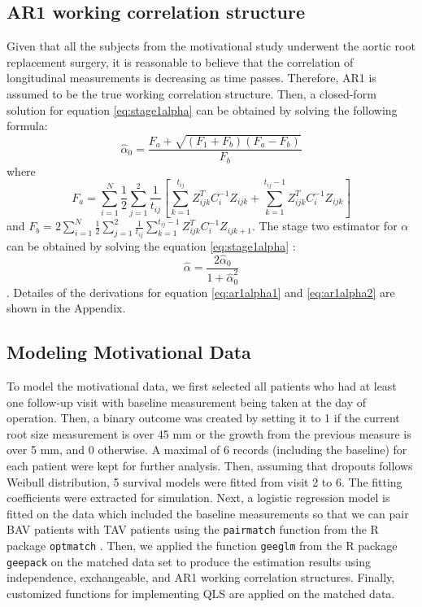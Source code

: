 \documentclass[
]{aft}
\begin{document}
\subsection{AR1 working correlation
structure}\label{ar1-working-correlation-structure}

Given that all the subjects from the motivational study underwent the
aortic root replacement surgery, it is reasonable to believe that the
correlation of longitudinal measurements is decreasing as time passes.
Therefore, AR1 is assumed to be the true working correlation structure.
Then, a closed-form solution for equation \eqref{eq:stage1alpha} can be
obtained by solving the following formula: \begin{equation}
\hat{\alpha}_0 = \frac{F_a + \sqrt{(F_1+F_b)(F_a-F_b)}}{F_b} \label{eq:ar1alpha1}
\end{equation} where \[
F_a = \sum_{i=1}^N \frac{1}{2} \sum_{j=1}^2 \frac{1}{t_{ij}}\left[\sum_{k=1}^{t_{ij}} Z_{ijk}^T C_i^{-1} Z_{ijk} + \sum_{k=1}^{t_{ij}-1}Z_{ijk}^T C_i^{-1} Z_{ijk}\right]
\] and
\(F_b = 2\sum_{i=1}^N \frac{1}{2}\sum_{j=1}^2\frac{1}{t_{ij}}\sum_{k=1}^{t_{ij}-1} Z_{ijk}^T C_i^{-1} Z_{ijk+1}\).
The stage two estimator for \(\alpha\) can be obtained by solving the
equation \eqref{eq:stage1alpha} \citep{Mitani2019}: \begin{equation}
\hat{\alpha} = \frac{2\hat{\alpha}_0}{1+\hat{\alpha}_0^2} \label{eq:ar1alpha2}
\end{equation}. Detailes of the derivations for equation
\eqref{eq:ar1alpha1} and \eqref{eq:ar1alpha2} are shown in the Appendix.

\subsection{Modeling Motivational
Data}\label{modeling-motivational-data}

To model the motivational data, we first selected all patients who had
at least one follow-up visit with baseline measurement being taken at
the day of operation. Then, a binary outcome was created by setting it
to 1 if the current root size measurement is over 45 mm or the growth
from the previous measure is over 5 mm, and 0 otherwise. A maximal of 6
records (including the baseline) for each patient were kept for further
analysis. Then, assuming that dropouts follows Weibull distribution, 5
survival models were fitted from visit 2 to 6. The fitting coefficients
were extracted for simulation. Next, a logistic regression model is
fitted on the data which included the baseline measurements so that we
can pair BAV patients with TAV patients using the \texttt{pairmatch}
function from the R package \texttt{optmatch} \citep{optmatch}. Then, we
applied the function \texttt{geeglm} from the R package \texttt{geepack}
on the matched data set to produce the estimation results using
independence, exchangeable, and AR1 working correlation structures.
Finally, customized functions for implementing QLS are applied on the
matched data.
\end{document}
